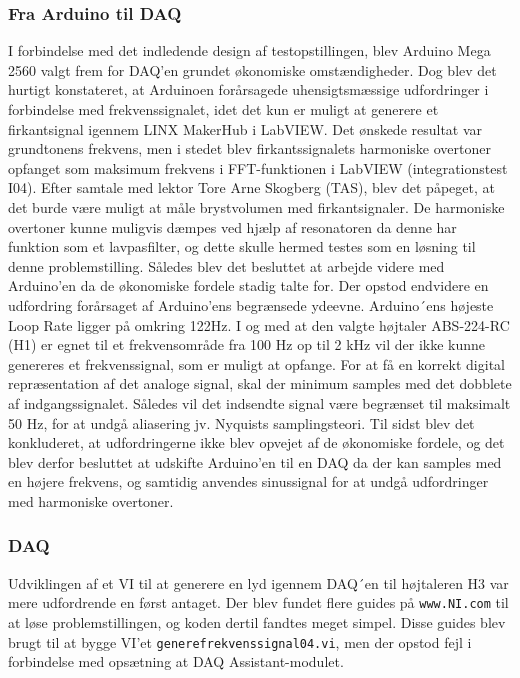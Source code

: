 \subsubsection{Fra Arduino til DAQ}

I forbindelse med det indledende design af testopstillingen, blev Arduino Mega 2560 valgt frem for DAQ'en grundet økonomiske omstændigheder. Dog blev det hurtigt konstateret, at Arduinoen forårsagede uhensigtsmæssige udfordringer i forbindelse med frekvenssignalet, idet det kun er muligt at generere et firkantsignal igennem LINX MakerHub i LabVIEW. Det ønskede resultat var grundtonens frekvens, men i stedet blev firkantssignalets harmoniske overtoner opfanget som maksimum frekvens i FFT-funktionen i LabVIEW (integrationstest I04). Efter samtale med lektor Tore Arne Skogberg (TAS), blev det påpeget, at det burde være muligt at måle brystvolumen med firkantsignaler. De harmoniske overtoner kunne muligvis dæmpes ved hjælp af resonatoren da denne har funktion som et lavpasfilter, og dette skulle hermed testes som en løsning til denne problemstilling. Således blev det besluttet at arbejde videre med Arduino'en da de økonomiske fordele stadig talte for. Der opstod endvidere en udfordring forårsaget af Arduino'ens begrænsede ydeevne. Arduino´ens højeste Loop Rate ligger på omkring 122Hz. I og med at den valgte højtaler ABS-224-RC (H1) er egnet til et frekvensområde fra 100 Hz op til 2 kHz vil der ikke kunne genereres et frekvenssignal, som er muligt at opfange. For at få en korrekt digital repræsentation af det analoge signal, skal der minimum samples med det dobblete af indgangssignalet. Således vil det indsendte signal være begrænset til maksimalt 50 Hz, for at undgå aliasering jv. Nyquists samplingsteori. Til sidst blev det konkluderet, at udfordringerne ikke blev opvejet af de økonomiske fordele, og det blev derfor besluttet at udskifte Arduino'en til en DAQ da der kan samples med en højere frekvens, og samtidig anvendes sinussignal for at undgå udfordringer med harmoniske overtoner.      

\subsubsection{DAQ}
Udviklingen af et VI til at generere en lyd igennem DAQ´en til højtaleren H3 var mere udfordrende en først antaget. Der blev fundet flere guides på \texttt{www.NI.com} til at løse problemstillingen, og koden dertil fandtes meget simpel. Disse guides blev brugt til at bygge VI'et \texttt{generefrekvenssignal04.vi}, men der opstod fejl i forbindelse med opsætning at DAQ Assistant-modulet. 

